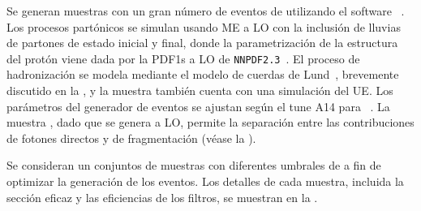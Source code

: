 Se generan muestras con un gran número de eventos de \gammajet utilizando el software ~\cite{Pythia8.1}. Los procesos partónicos se simulan usando \ac{ME} a \ac{LO} con la inclusión de lluvias de partones de estado inicial y final, donde la parametrización de la estructura del protón viene dada por la \acp{PDF1} a \ac{LO} de \texttt{NNPDF2.3}~\cite{NNPDF2}.
El proceso de hadronización se modela mediante el modelo de cuerdas de Lund~\cite{Anderson-1983}, brevemente discutido en la \Sect{\ref{subsec:theory:mc_simulation:hadronisation}}, y la muestra también cuenta con una simulación del \ac{UE}.
Los parámetros del generador de eventos se ajustan según el tune A14 para \Pythia~\cite{Pythia-A14Tune}.
La muestra \pythia, dado que se genera a \ac{LO}, permite la separación entre las contribuciones de fotones directos y de fragmentación (véase la \Sect{\ref{subsec:theory:sm:prompt_photon}}).

Se consideran un conjuntos de muestras con diferentes umbrales de \pt a fin de optimizar la generación de los eventos. Los detalles de cada muestra, incluida la sección eficaz y las eficiencias de los filtros, se muestran en la \Tab{\ref{tab:samples:samples:bkg:samples}}.

